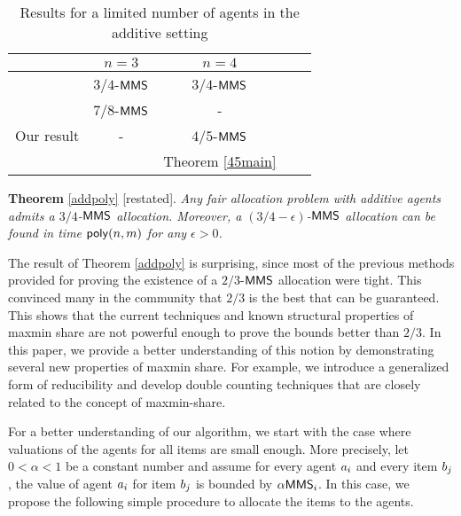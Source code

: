 \begin{table}[t]\centering
	\caption{Results for a limited number of agents in the additive setting}
	\begin{tabular}{|l|c|c|c|c|}
		\hline
		& $n=3$ & $n=4$\\
		\hline
		\procacciafirst ~\cite{Procaccia:first}  & $3/4$-$\mathsf{MMS}$  & $3/4$-$\mathsf{MMS}$\\
		\hline
		\amanatidisapproximation ~\cite{amanatidis2015approximation}  & $7/8$-$\mathsf{MMS}$  & -\\
		\hline
		\color{magenta}Our result \color{black} & - & $4/5$-$\mathsf{MMS}$\\
		& & \color{magenta} Theorem \ref{45main} \color{black}\\
		\hline
	\end{tabular}
	
	
	\begin{tablenotes}
		\item
		\item
		\item
	\end{tablenotes}
	
	\label{resultstable2}
\end{table}

\vspace{0.2cm}
{\noindent \textbf{Theorem} \ref{addpoly} [restated]. \textit{Any fair allocation problem with additive agents admits a $3/4$-$\mathsf{MMS}$ allocation. Moreover, a $(3/4-\epsilon)$-$\mathsf{MMS}$ allocation can be found in time $\mathsf{poly}(n,m)$ for any $\epsilon > 0$.\\}}

The result of Theorem \ref{addpoly} is surprising, since most of the previous methods provided for proving the existence of a $2/3$-$\mathsf{MMS}$ allocation were tight.  
This convinced many in the community that $2/3$ is the best that can be guaranteed. This shows that the current techniques and known structural properties of maxmin share are not powerful enough to prove the bounds better than $2/3$. In this paper, we provide a better understanding of this notion by demonstrating several new properties of maxmin share. For example, we introduce a generalized form of reducibility and develop double counting techniques that are closely related to the concept of maxmin-share.  


For a better understanding of our algorithm, we start with the case where valuations of the agents for all items are small enough. More precisely, let $0 < \alpha < 1$ be a constant number and assume for every agent $a_i$ and every item $b_j$, the value of agent $a_i$ for item $b_j$ is bounded by $\alpha \mathsf{MMS}_i$. In this case, we propose the following simple procedure to allocate the items to the agents.

